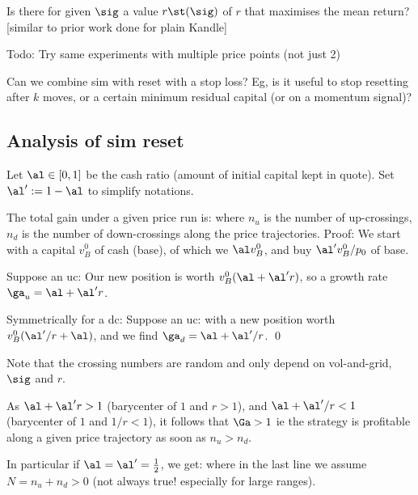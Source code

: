 \documentclass[oneside,12pt]{article}
\begin{document}
\QS[1] Is there for given $\sig$ a value $r\st(\sig)$ of $r$ that maximises the mean return? [similar to prior work done
for plain Kandle]

Todo: Try same experiments with multiple price points (not just 2)

Can we combine sim with reset with a stop loss? Eg, is it useful to stop resetting after $k$ moves,
or a certain minimum residual capital (or on a momentum signal)?



\subsection{Analysis of sim reset}

Let $\al\in[0,1]$ be the cash ratio (amount of initial capital kept in quote).
Set $\al':=1-\al$ to simplify notations.

\PRO 
The total gain under a given price run is:
where $n_u$ is the number of up-crossings, $n_d$
is the number of down-crossings along the price trajectories.
\ORP
Proof:
We start with a capital $v^0_B$ of cash (base),
of which we $\al v^0_B$, and buy $\al'v^0_B/p_0$ of base. 

Suppose an uc:
Our new position is worth $v^0_B(\al+ \al'r)$,
so a growth rate $\ga_u=\al+ \al'r$.

Symmetrically for a dc:
Suppose an uc:
with a new position worth $v^0_B(\al'/r+\al )$, and we find $\ga_d=\al+ \al'/r$.
\qed

Note that the crossing numbers are random and only depend on vol-and-grid, $\sig$ and $r$.

As
$\al+\al' r>1$ (barycenter of $1$ and $r>1$), and  
$\al+\al'/r<1$ (barycenter of $1$ and $1/r<1$),
it follows that $\Ga>1$ ie the strategy is profitable along a given price trajectory as soon as $n_u>n_d$.

In particular if $\al=\al'=\frac12$, we get:
where in the last line we assume $N=n_u+n_d>0$ (not always true! especially for large ranges).
\end{document}
